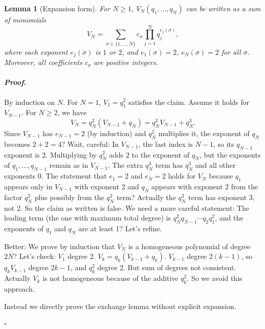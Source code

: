 \documentclass[12pt]{article}
\theoremstyle{plain}
\newtheorem{lemma}[theorem]{Lemma}
\theoremstyle{definition}
\theoremstyle{remark}
\renewenvironment{proof}{\paragraph{\textit{Proof}.}}{\hfill$\square$}
\begin{document}
\begin{lemma}[Expansion form]
For $N\ge 1$, $V_N(q_1,\dots,q_N)$ can be written as a sum of monomials
\[
V_N = \sum_{\sigma\in\{1,\dots,N\}} c_\sigma \prod_{j=1}^N q_j^{e_j(\sigma)},
\]
where each exponent $e_j(\sigma)$ is $1$ or $2$, and $e_1(\sigma)=2$, $e_N(\sigma)=2$ for all $\sigma$. Moreover, all coefficients $c_\sigma$ are positive integers.
\end{lemma}
\begin{proof}
By induction on $N$. For $N=1$, $V_1=q_1^2$ satisfies the claim. Assume it holds for $V_{N-1}$. For $N\ge2$, we have
\[
V_N = q_N^2(V_{N-1}+q_N)= q_N^2V_{N-1}+q_N^3.
\]
Since $V_{N-1}$ has $e_{N-1}=2$ (by induction) and $q_N^2$ multiplies it, the exponent of $q_N$ becomes $2+2=4$? Wait, careful: In $V_{N-1}$, the last index is $N-1$, so its $q_{N-1}$ exponent is $2$. Multiplying by $q_N^2$ adds $2$ to the exponent of $q_N$, but the exponents of $q_1,\dots,q_{N-1}$ remain as in $V_{N-1}$. The extra $q_N^3$ term has $q_N^3$ and all other exponents 0. The statement that $e_1=2$ and $e_N=2$ holds for $V_N$ because $q_1$ appears only in $V_{N-1}$ with exponent $2$ and $q_N$ appears with exponent $2$ from the factor $q_N^2$ plus possibly from the $q_N^3$ term? Actually the $q_N^3$ term has exponent 3, not 2. So the claim as written is false. We need a more careful statement: The leading term (the one with maximum total degree) is $q_N^2 q_{N-1}\cdots q_2 q_1^2$, and the exponents of $q_1$ and $q_N$ are at least 1? Let's refine.

Better: We prove by induction that $V_N$ is a homogeneous polynomial of degree $2N$? Let's check: $V_1$ degree 2. $V_k = q_k(V_{k-1}+q_k)$. $V_{k-1}$ degree $2(k-1)$, so $q_k V_{k-1}$ degree $2k-1$, and $q_k^2$ degree 2. But sum of degrees not consistent. Actually $V_k$ is not homogeneous because of the additive $q_k^2$. So we avoid this approach.

Instead we directly prove the exchange lemma without explicit expansion.


\end{proof}
\end{document}

